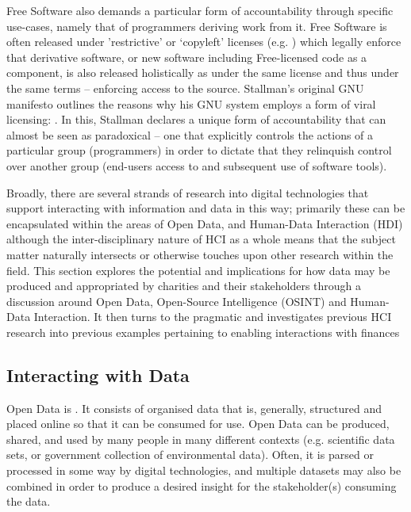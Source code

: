 Free Software also demands a particular form of accountability through specific use-cases, namely that of programmers deriving work from it. Free Software is often released under 'restrictive' or `copyleft' licenses (e.g. \cite{free_software_foundation_gnu_2007}) which legally enforce that derivative software, or new software including Free-licensed code as a component, is also released holistically as under the same license and thus under the same terms -- enforcing access to the source. Stallman's original GNU manifesto outlines the reasons why his GNU system employs a form of viral licensing:  \cite{stallman_gnu_1985}. In this, Stallman declares a unique form of accountability that can almost be seen as paradoxical -- one that explicitly controls the actions of a particular group (programmers) in order to dictate that they relinquish control over another group (end-users access to and subsequent use of software tools).


Broadly, there are several strands of research into digital technologies that support interacting with information and data in this way; primarily these can be encapsulated within the areas of Open Data, and Human-Data Interaction (HDI) although the inter-disciplinary nature of HCI as a whole means that the subject matter naturally intersects or otherwise touches upon other research within the field. This section explores the potential and implications for how data may be produced and appropriated by charities and their stakeholders through a discussion around Open Data, Open-Source Intelligence (OSINT) and Human-Data Interaction. It then turns to the pragmatic and investigates previous HCI research into previous examples pertaining to enabling interactions with finances

\subsection{Interacting with Data}
Open Data is  \cite{open_data_institute_what_nodate}. It consists of organised data that is, generally, structured and placed online so that it can be consumed for use. Open Data can be produced, shared, and used by many people in many different contexts (e.g. scientific data sets, or government collection of environmental data). Often, it is parsed or processed in some way by digital technologies, and multiple datasets may also be combined in order to produce a desired insight for the stakeholder(s) consuming the data.

